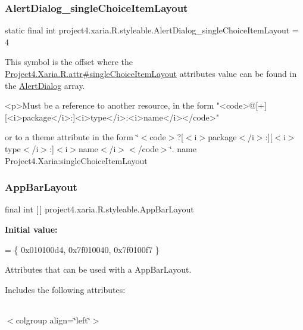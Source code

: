 \subsubsection{\texorpdfstring{Alert\+Dialog\+\_\+single\+Choice\+Item\+Layout}{AlertDialog\_singleChoiceItemLayout}}
{\footnotesize\ttfamily static final int project4.\+xaria.\+R.\+styleable.\+Alert\+Dialog\+\_\+single\+Choice\+Item\+Layout = 4\hspace{0.3cm}{\ttfamily [static]}}

This symbol is the offset where the \hyperlink{}{Project4.\+Xaria.\+R.\+attr\#single\+Choice\+Item\+Layout} attribute\textquotesingle{}s value can be found in the \hyperlink{classproject4_1_1xaria_1_1R_1_1styleable_a03310da91bbeadbad8196e09427a2ba7}{Alert\+Dialog} array.

\begin{DoxyVerb}      <p>Must be a reference to another resource, in the form "<code>@[+][<i>package</i>:]<i>type</i>:<i>name</i></code>"
\end{DoxyVerb}
 or to a theme attribute in the form \char`\"{}$<$code$>$?\mbox{[}$<$i$>$package$<$/i$>$\+:\mbox{]}\mbox{[}$<$i$>$type$<$/i$>$\+:\mbox{]}$<$i$>$name$<$/i$>$$<$/code$>$\char`\"{}.  name Project4.\+Xaria\+:single\+Choice\+Item\+Layout \mbox{\label{classproject4_1_1xaria_1_1R_1_1styleable_aff523d344137cf82b06e00b519e99093}} 
\subsubsection{\texorpdfstring{App\+Bar\+Layout}{AppBarLayout}}
{\footnotesize\ttfamily final int \mbox{[}$\,$\mbox{]} project4.\+xaria.\+R.\+styleable.\+App\+Bar\+Layout\hspace{0.3cm}{\ttfamily [static]}}

{\bfseries Initial value\+:}
\begin{DoxyCode}
= \{
            0x010100d4, 0x7f010040, 0x7f0100f7
        \}
\end{DoxyCode}
Attributes that can be used with a App\+Bar\+Layout. 

Includes the following attributes\+:

\tabulinesep=1mm
\begin{longtabu} spread 0pt [c]{*{0}{|X[-1]}|}
\hline
\end{longtabu}
$<$colgroup align=\char`\"{}left\char`\"{}$>$ 

